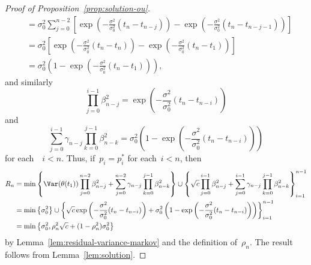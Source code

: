 \begin{proof}[Proof of Proposition~\ref{prop:solution-ou}]
\begin{align*}
        &= \sigma_0^2\sum_{j=0}^{n-2}\left[\exp\left(-\frac{\sigma^2}{\sigma_0^2}(t_{n}-t_{n-j})\right)-\exp\left(-\frac{\sigma^2}{\sigma_0^2}(t_n-t_{n-j-1})\right)\right] \\
        &= \sigma_0^2\left[\exp\left(-\frac{\sigma^2}{\sigma_0^2}(t_{n}-t_{n})\right)-\exp\left(-\frac{\sigma^2}{\sigma_0^2}(t_n-t_1)\right)\right] \\
        &= \sigma_0^2\left(1-\exp\left(-\frac{\sigma^2}{\sigma_0^2}(t_n-t_1)\right)\right),
    \end{align*}
    and similarly
    \[ \prod_{j=0}^{i-1}\beta_{n-j}^2=\exp\left(-\frac{\sigma^2}{\sigma_0^2}(t_n-t_{n-i})\right) \]
    and
    \[ \sum_{j=0}^{i-1}\gamma_{n-j}\prod_{k=0}^{j-1}\beta_{n-k}^2=\sigma_0^2\left(1-\exp\left(-\frac{\sigma^2}{\sigma_0^2}(t_n-t_{n-i})\right)\right) \]
    for each~~$i<n$.
    Thus, if~$p_i=p_i^*$ for each~$i<n$, then
    \begin{align*}
        R_n
        &= \min\left\{\Var(\theta(t_1))\prod_{j=0}^{n-2}\beta_{n-j}^2+\sum_{j=0}^{n-2}\gamma_{n-j}\prod_{k=0}^{j-1}\beta_{n-k}^2\right\}\cup\left\{\sqrt{c}\prod_{j=0}^{i-1}\beta_{n-j}^2+\sum_{j=0}^{i-1}\gamma_{n-j}\prod_{k=0}^{j-1}\beta_{n-k}^2\right\}_{i=1}^{n-1} \\
        &= \min\left\{\sigma_0^2\right\}\cup\left\{\sqrt{c}\exp\left(-\frac{\sigma^2}{\sigma_0^2}(t_n-t_{n-i})\right)+\sigma_0^2\left(1-\exp\left(-\frac{\sigma^2}{\sigma_0^2}(t_n-t_{n-i})\right)\right)\right\}_{i=1}^{n-1} \\
        &= \min\left\{\sigma_0^2,\rho_n^2\sqrt{c}+(1-\rho_n^2)\sigma_0^2\right\}
    \end{align*}
    by Lemma~\ref{lem:residual-variance-markov} and the definition of~$\rho_n$.
    The result follows from Lemma~\ref{lem:solution}.
\end{proof}